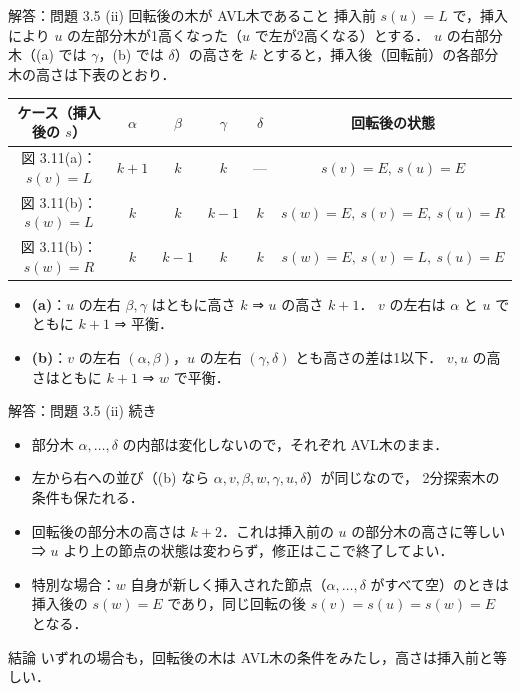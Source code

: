 \documentclass[aspectratio=169,11pt]{beamer}
\begin{document}
\begin{frame}{解答：問題 3.5 (ii) 回転後の木が AVL木であること}
  挿入前 $s(u)=L$ で，挿入により $u$ の左部分木が1高くなった（$u$ で左が2高くなる）とする．
  $u$ の右部分木（(a) では $\gamma$，(b) では $\delta$）の高さを $k$ とすると，挿入後（回転前）の各部分木の高さは下表のとおり．
  \begin{center}
  \renewcommand{\arraystretch}{1.2}
  \begin{tabular}{c|cccc|c}
    ケース（挿入後の $s$） & $\alpha$ & $\beta$ & $\gamma$ & $\delta$ & 回転後の状態 \\\hline
    図 3.11(a)：$s(v)=L$ & $k{+}1$ & $k$ & $k$ & --- & $s(v)=E,\ s(u)=E$ \\
    図 3.11(b)：$s(w)=L$ & $k$ & $k$ & $k{-}1$ & $k$ & $s(w)=E,\ s(v)=E,\ s(u)=R$ \\
    図 3.11(b)：$s(w)=R$ & $k$ & $k{-}1$ & $k$ & $k$ & $s(w)=E,\ s(v)=L,\ s(u)=E$
  \end{tabular}
  \end{center}
  \begin{itemize}
    \item \textbf{(a)}：$u$ の左右 $\beta,\gamma$ はともに高さ $k$ ⇒ $u$ の高さ $k{+}1$．
          $v$ の左右は $\alpha$ と $u$ でともに $k{+}1$ ⇒ 平衡．
    \item \textbf{(b)}：$v$ の左右 $(\alpha,\beta)$，$u$ の左右 $(\gamma,\delta)$ とも高さの差は1以下．
          $v,u$ の高さはともに $k{+}1$ ⇒ $w$ で平衡．
  \end{itemize}
\end{frame}

\begin{frame}{解答：問題 3.5 (ii) 続き}
  \begin{itemize}
    \item 部分木 $\alpha,\ldots,\delta$ の内部は変化しないので，それぞれ AVL木のまま．
    \item 左から右への並び（(b) なら $\alpha,v,\beta,w,\gamma,u,\delta$）が同じなので，
          2分探索木の条件も保たれる．
    \item 回転後の部分木の高さは $k{+}2$．これは挿入前の $u$ の部分木の高さに等しい
          ⇒ $u$ より上の節点の状態は変わらず，修正はここで終了してよい．
    \item 特別な場合：$w$ 自身が新しく挿入された節点（$\alpha,\ldots,\delta$ がすべて空）のときは
          挿入後の $s(w)=E$ であり，同じ回転の後 $s(v)=s(u)=s(w)=E$ となる．
  \end{itemize}
  \begin{alertblock}{結論}
    いずれの場合も，回転後の木は AVL木の条件をみたし，高さは挿入前と等しい．
  \end{alertblock}
\end{frame}
\end{document}
